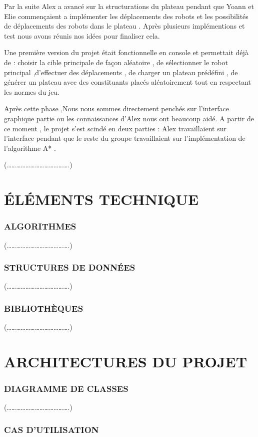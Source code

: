 \documentclass[a4paper]{article} %
\begin{document}
Par la suite Alex a avancé sur la structurations du plateau  pendant que Yoann et Elie  commençaient a implémenter les déplacements des robots et les possibilités de déplacements des robots dans le plateau . Après plusieurs implémentions et test nous avons réunis nos idées pour finaliser cela. 

Une première version du projet était fonctionnelle en console et permettait déjà de :  choisir la cible principale de façon aléatoire , de sélectionner le robot principal ,d’effectuer des déplacements , de charger un plateau prédéfini , de générer un plateau avec des constituants placés aléatoirement tout en respectant les normes du jeu.

Après cette phase ,Nous nous sommes directement penchés sur l’interface graphique partie ou les connaissances d’Alex nous ont beaucoup aidé. A partir de ce moment , le projet s’est scindé en deux parties : Alex travaillaient sur l’interface pendant que le reste du groupe travaillaient sur l’implémentation de l’algorithme A* .

(………………………………….)

\section{ÉLÉMENTS  TECHNIQUE }	
\subsubsection{ALGORITHMES}

(………………………………….)
\subsubsection{STRUCTURES DE DONNÉES }

(………………………………….)
\subsubsection{BIBLIOTHÈQUES}

(………………………………….)

\section{ARCHITECTURES DU PROJET }
\subsubsection{DIAGRAMME DE CLASSES }

(………………………………….)
\subsubsection{ CAS D’UTILISATION}
\end{document}
